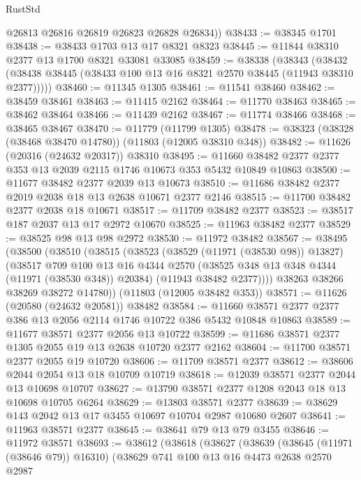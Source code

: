 \begin{lexlean}{RustStd}
\begin{coremodule}
        @26813
        @26816
        @26819
        @26823
        @26828
        @26834))
@38433 := @38345 @1701
@38438 := @38433 @1703 @13 @17 @8321 @8323
@38445 := @11844 @38310 @2377 @13 @1700 @8321 @33081 @33085
@38459 := @38338
    (@38343 (@38432 (@38438 @38445 (@38433 @100 @13 @16 @8321 @2570 @38445 (@11943 @38310 @2377)))))
@38460 := @11345 @1305
@38461 := @11541 @38460
@38462 := @38459 @38461
@38463 := @11415 @2162
@38464 := @11770 @38463
@38465 := @38462 @38464
@38466 := @11439 @2162
@38467 := @11774 @38466
@38468 := @38465 @38467
@38470 := @11779 (@11799 @1305)
@38478 := @38323 (@38328 (@38468 @38470 @14780)) (@11803 (@12005 @38310 @348))
@38482 := @11626 (@20316 (@24632 @20317)) @38310
@38495 := @11660 @38482 @2377 @2377 @353 @13 @2039 @2115 @1746 @10673 @353 @5432 @10849 @10863
@38500 := @11677 @38482 @2377 @2039 @13 @10673
@38510 := @11686 @38482 @2377 @2019 @2038 @18 @13 @2638 @10671 @2377 @2146
@38515 := @11700 @38482 @2377 @2038 @18 @10671
@38517 := @11709 @38482 @2377
@38523 := @38517 @187 @2037 @13 @17 @2972 @10670
@38525 := @11963 @38482 @2377
@38529 := @38525 @98 @13 @98 @2972
@38530 := @11972 @38482
@38567 := @38495
    (@38500
      (@38510
        (@38515
          (@38523
            (@38529 (@11971 (@38530 @98)) @13827)
            (@38517
              @709
              @100
              @13
              @16
              @4344
              @2570
              (@38525 @348 @13 @348 @4344 (@11971 (@38530 @348)) @20384)
              (@11943 @38482 @2377))))
        @38263
        @38266
        @38269
        @38272
        @14780))
    (@11803 (@12005 @38482 @353))
@38571 := @11626 (@20580 (@24632 @20581)) @38482
@38584 := @11660 @38571 @2377 @2377 @386 @13 @2056 @2114 @1746 @10722 @386 @5432 @10848 @10863
@38589 := @11677 @38571 @2377 @2056 @13 @10722
@38599 := @11686 @38571 @2377 @1305 @2055 @19 @13 @2638 @10720 @2377 @2162
@38604 := @11700 @38571 @2377 @2055 @19 @10720
@38606 := @11709 @38571 @2377
@38612 := @38606 @2044 @2054 @13 @18 @10709 @10719
@38618 := @12039 @38571 @2377 @2044 @13 @10698 @10707
@38627 := @13790 @38571 @2377 @1208 @2043 @18 @13 @10698 @10705 @6264
@38629 := @13803 @38571 @2377
@38639 := @38629 @143 @2042 @13 @17 @3455 @10697 @10704 @2987 @10680 @2607
@38641 := @11963 @38571 @2377
@38645 := @38641 @79 @13 @79 @3455
@38646 := @11972 @38571
@38693 := @38612
    (@38618
      (@38627
        (@38639
          (@38645 (@11971 (@38646 @79)) @16310)
          (@38629
            @741
            @100
            @13
            @16
            @4473
            @2638
            @2570
            @2987

\end{coremodule}
\end{lexlean}
